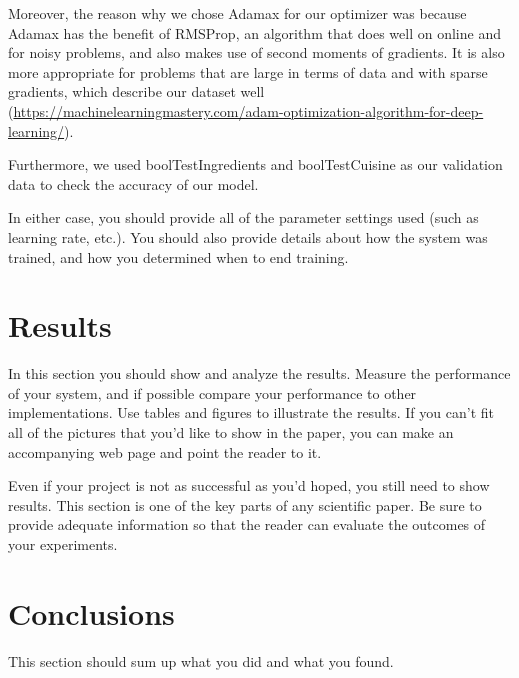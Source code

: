 \documentclass[11pt]{article}
\begin{document}
Moreover, the reason why we chose Adamax for our optimizer was because Adamax has the benefit of RMSProp,
an algorithm that does well on online and for noisy problems, and also makes
use of second moments of gradients. It is also more appropriate for problems
that are large in terms of data and with sparse gradients, which describe our
dataset well (\url{https://machinelearningmastery.com/adam-optimization-algorithm-for-deep-learning/}).


Furthermore, we used boolTestIngredients and boolTestCuisine as our validation data
to check the accuracy of our model. 

In either case, you should provide all of the parameter settings used (such
as learning rate, etc.).  You should also provide details about how
the system was trained, and how you determined when to end training.


\section{Results}

In this section you should show and analyze the results.  Measure the
performance of your system, and if possible compare your performance
to other implementations. Use tables and figures to illustrate the
results.  If you can't fit all of the pictures that you'd like to show
in the paper, you can make an accompanying web page and point the
reader to it.

Even if your project is not as successful as you'd hoped, you still
need to show results.  This section is one of the key parts of any
scientific paper.  Be sure to provide adequate information so that the
reader can evaluate the outcomes of your experiments.

\section{Conclusions}

This section should sum up what you did and what you found.
\end{document}
